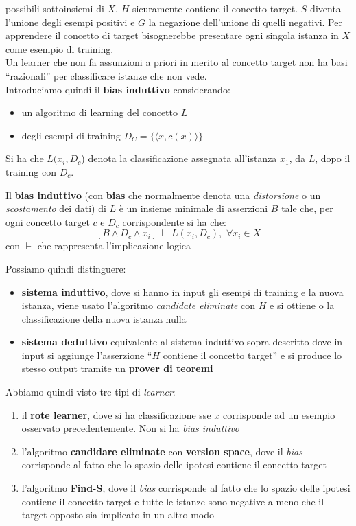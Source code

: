 \documentclass[a4paper,12pt, oneside]{book}
\begin{document}
possibili sottoinsiemi di $X$. $H$ sicuramente contiene il concetto target. $S$
diventa l'unione degli esempi positivi e $G$ la negazione dell'unione di quelli
negativi. Per apprendere il concetto di target bisognerebbe presentare ogni
singola istanza in $X$ come esempio di training.\\
Un learner che non fa assunzioni a priori in merito al concetto target non ha
basi ``razionali'' per classificare istanze che non vede.\\
Introduciamo quindi il \textbf{bias induttivo} considerando:
\begin{itemize}
  \item un algoritmo di learning del concetto $L$
  \item degli esempi di training $D_C=\{\langle x,c(x)\rangle\}$
\end{itemize}
Si ha che $L(x_i,D_c$) denota la classificazione assegnata all'istanza $x_1$, da
$L$, dopo il training con $D_c$.
\begin{definizione}
  Il \textbf{bias induttivo} (con \textbf{bias} che normalmente denota una
  \emph{distorsione} o un \emph{scostamento} dei dati) di $L$ è un insieme
  minimale di asserzioni $B$ tale 
  che, per ogni concetto target $c$ e $D_c$ corrispondente si ha che:
  \[[B\land D_c\land x_i]\,\vdash\,L(x_i,D_c),\,\,\forall x_i\in X\]
  con $\vdash$ che rappresenta l'implicazione logica
\end{definizione}
Possiamo quindi distinguere:
\begin{itemize}
  \item \textbf{sistema induttivo}, dove si hanno in input gli esempi di
  training e la nuova istanza, viene usato l'algoritmo \textit{candidate
    eliminate} con $H$ e si ottiene o la classificazione della nuova istanza
  nulla
  \item \textbf{sistema deduttivo} equivalente al sistema induttivo sopra
  descritto dove in input si aggiunge l'asserzione ``$H$ contiene il concetto
  target'' e si produce lo stesso output tramite un \textbf{prover di teoremi}
\end{itemize}
Abbiamo quindi visto tre tipi di \textit{learner}:
\begin{enumerate}
  \item il \textbf{rote learner}, dove si ha classificazione sse $x$ corrisponde
  ad un esempio osservato precedentemente. Non si ha \textit{bias induttivo}
  \item l'algoritmo \textbf{candidare eliminate} con \textbf{version space},
  dove il \textit{bias} corrisponde al fatto che lo spazio delle ipotesi
  contiene il concetto target 
  \item l'algoritmo \textbf{Find-S}, dove il \textit{bias} corrisponde al fatto
  che lo spazio delle ipotesi contiene il concetto target e tutte le istanze
  sono negative a meno che il target opposto sia implicato in un altro modo 
\end{enumerate}
\end{document}
